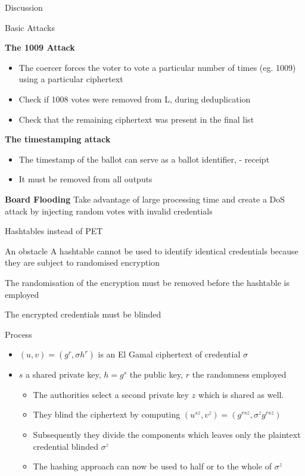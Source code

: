 \documentclass{beamer}
\begin{document}
\begin{frame}[allowframebreaks]{Discussion}
\begin{block}{Basic Attacks \cite{WDSmith05}}

\textbf{The 1009 Attack}

\begin{itemize}
\item The coercer forces the voter to vote a particular number of times (eg. 1009) using a particular ciphertext
\item Check if 1008 votes were removed from L, during deduplication
\item Check that the remaining ciphertext was present in the final list
\end{itemize}

\textbf{The timestamping attack}

\begin{itemize}
\item The timestamp of the ballot can serve as a ballot identifier, - receipt
\item It must be removed from all outputs
\end{itemize}

\textbf{Board Flooding}
Take advantage of large processing time and create a DoS attack by injecting random votes with invalid credentials

\end{block}

\end{frame}

\begin{frame}[allowframebreak]{Hashtables instead of PET}

\begin{block}{An obstacle}
A hashtable cannot be used to identify identical credentials because they are subject to randomised encryption

The randomisation of the encryption must be removed  before the hashtable is employed

The encrypted credentials must be blinded
\end{block}

Process

\begin{itemize}
\item $(u,v) = (g^r, \sigma h^r)$ is an El Gamal ciphertext of credential $\sigma$
\item $s$ a shared private key, $h=g^s$ the public key, $r$ the randomness employed
\begin{itemize}
\item The authorities select a second private key $z$ which is shared as well.
\item They blind the ciphertext by computing $(u^{sz}, v^z) = (g^{rsz}, \sigma^z g^{rsz})$
\item Subsequently they divide the components which leaves only the plaintext credential blinded $\sigma^z$
\item The hashing approach can now be used to half \cite{WDSmith05} or to the whole \cite{Weber07} of $\sigma^z$ 
\end{itemize} 
\end{itemize}
\end{frame}
\end{document}
